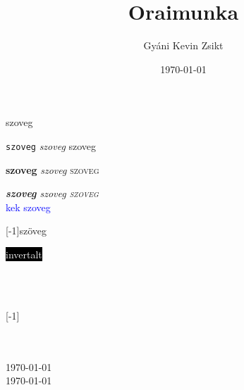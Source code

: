 \documentclass{article}
\begin{document}
szoveg


\texttt{szoveg}
\textsl{szoveg}
\textsf{szoveg}

\textbf{szoveg}
\textit{szoveg}
\textsc{szoveg}

\emph{\textbf{szoveg}
\textit{szoveg}
\textsc{szoveg}}\\

\textcolor{blue}{kek szoveg} 




\scalebox{2}[-1]{szöveg}

\colorbox{black}{\textcolor{white}{invertalt}}

\\

\blindtext

\framebox{\parbox{5cm}{\blindtext}}\\
\scalebox{2}[-1]{\parbox{5cm}{\blindtext}}\\

\linespread{1.6}\selectfont
\raggedleft{\blindtext}\\
\today\\
\today\\

\title{Oraimunka}
\author{Gyáni Kevin Zsikt}
\date{\today}
\maketitle
\blindtext
\end{document}
